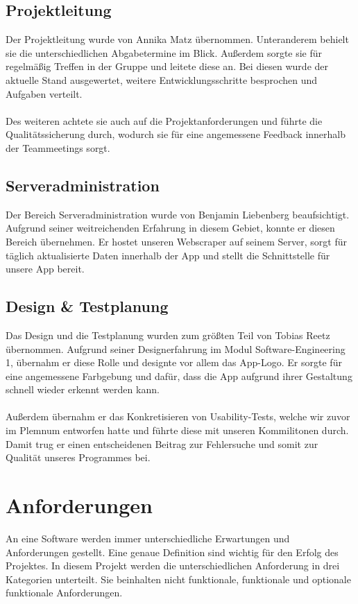 \documentclass[conference]{IEEEtran}
\begin{document}
\subsection{Projektleitung}
Der Projektleitung wurde von Annika Matz übernommen. Unteranderem behielt sie die unterschiedlichen Abgabetermine im Blick. Außerdem sorgte sie für regelmäßig Treffen in der Gruppe und leitete diese an. Bei diesen wurde der aktuelle Stand ausgewertet, weitere Entwicklungsschritte besprochen und Aufgaben verteilt. \\\\
Des weiteren achtete sie auch auf die Projektanforderungen und führte die Qualitätssicherung durch, wodurch sie für eine angemessene Feedback innerhalb der Teammeetings sorgt.

\subsection{Serveradministration}
Der Bereich Serveradministration wurde von Benjamin Liebenberg beaufsichtigt. Aufgrund seiner weitreichenden Erfahrung in diesem Gebiet, konnte er diesen Bereich übernehmen. Er hostet unseren Webscraper auf seinem Server, sorgt für täglich aktualisierte Daten innerhalb der App und stellt die Schnittstelle für unsere App bereit.

\subsection{Design \& Testplanung}
Das Design und die Testplanung wurden zum größten Teil von Tobias Reetz übernommen. Aufgrund seiner Designerfahrung im Modul Software-Engineering 1, übernahm er diese Rolle und designte vor allem das App-Logo. Er sorgte für eine angemessene Farbgebung und dafür, dass die App aufgrund ihrer Gestaltung schnell wieder erkennt werden kann. \\\\
Außerdem übernahm er das Konkretisieren von Usability-Tests, welche wir zuvor im Plemnum entworfen hatte und führte diese mit unseren Kommilitonen durch. Damit trug er einen entscheidenen Beitrag zur Fehlersuche und somit zur Qualität unseres Programmes bei.

\section{Anforderungen}
An eine Software werden immer unterschiedliche Erwartungen und Anforderungen gestellt. Eine genaue Definition sind wichtig für den Erfolg des Projektes. In diesem Projekt werden die unterschiedlichen Anforderung in drei Kategorien unterteilt. Sie beinhalten nicht funktionale, funktionale und optionale funktionale Anforderungen.
\end{document}
